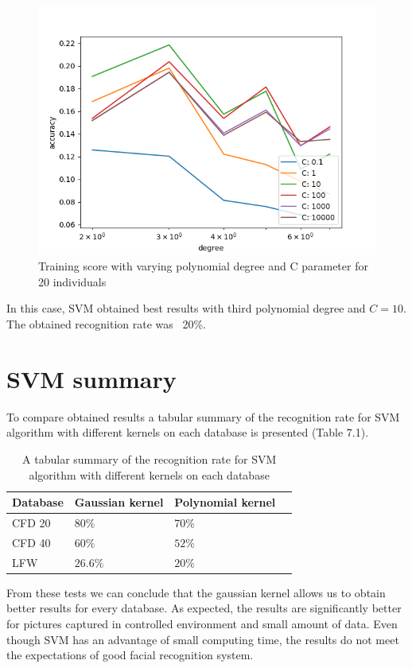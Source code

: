 \begin{figure}[H]
\centering
\includegraphics[scale=0.75]{img/svm/better_graphs/lwf_poly.png}
\caption{Training score with varying polynomial degree and C parameter for 20 individuals}
\end{figure} 

In this case, SVM obtained best results with third polynomial degree and $C = 10$. The obtained recognition rate was ~20\%.


\section{SVM summary}

To compare obtained results a tabular summary of the recognition rate for SVM algorithm with different kernels on each database is presented (Table 7.1).

\begin{table}[H]
	\centering
	\caption{A tabular summary of the recognition rate for SVM algorithm with different kernels on each database}
    \begin{tabular}{ | l | l | l | l |}
    \hline
    \rowcolor{lightgray}
    Database &  Gaussian kernel & Polynomial kernel\\ \hline
    CFD 20&  80\%  & 70\%\\ \hline
	CFD 40& $60\%$ & $52\%$ \\ \hline
    LFW & $26.6\%$ & $20\%$ \\ \hline
    \end{tabular}
\end{table}

From these tests we can conclude that the gaussian kernel allows us to obtain better results for every database. As expected, the results are significantly better for pictures captured in controlled environment and small amount of data. Even though SVM has an advantage of small computing time, the results do not meet the expectations of good facial recognition system. 

